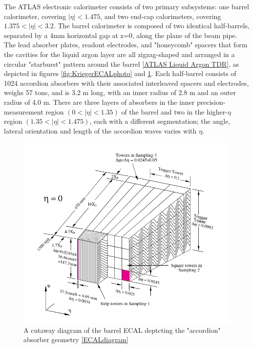 The ATLAS electronic calorimeter consists of two primary subsystems: one barrel calorimeter, covering $ |\eta |<1.475$, and two end-cap calorimeters, covering $ 1.375<| \eta |< 3.2 $. The barrel calorimeter is composed of two identical half-barrels, separated by a 4mm horizontal gap at z=0, along the plane of the beam pipe. The lead absorber plates, readout electrodes, and "honeycomb" spacers that form the cavities for the liquid argon layer are all zigzag-shaped and arranged in a circular "starburst" pattern around the barrel \ref{ATLAS Liquid Argon TDR}, as depicted in figures \ref{fig:KriegerECALphoto} and \ref{fig:ECALdiagram}. Each half-barrel consists of 1024 accordion absorbers with their associated interleaved spacers and electrodes, weighs 57 tons, and is 3.2 m long, with an inner radius of 2.8 m and an outer radius of 4.0 m. There are three layers of absorbers in the inner precision-measurement region $(0 <| \eta |< 1.35)$ of the barrel and two in the higher-$\eta$ region $(1.35 < | \eta |<1.475)$, each with a different segmentation; the angle, lateral orientation and length of the accordion waves varies with $\eta$.

\begin{figure}
  \includegraphics[width=\linewidth]{figures/detector_chapter/ECALdiagram.png}
  \caption{A cutaway diagram of the barrel ECAL deptcting the "accordion" absorber geometry \ref{ECALdiagram}}
  \label{fig:ECALdiagram}
\end{figure}

